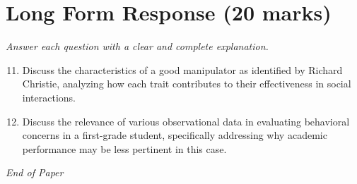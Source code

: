 \documentclass[12pt]{article}
\begin{document}
\section*{Long Form Response (20 marks)}
\textit{Answer each question with a clear and complete explanation.}
\begin{enumerate}[label=\arabic*.]
\setcounter{enumi}{10}
\item Discuss the characteristics of a good manipulator as identified by Richard Christie, analyzing how each trait contributes to their effectiveness in social interactions.
\item Discuss the relevance of various observational data in evaluating behavioral concerns in a first-grade student, specifically addressing why academic performance may be less pertinent in this case.
\end{enumerate}

\vfill
\noindent\textit{End of Paper}
\end{document}
